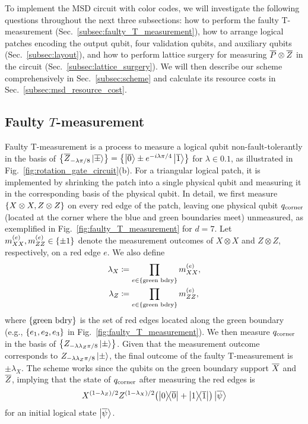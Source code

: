 \documentclass[
 prx,
 reprint,
 superscriptaddress,
 longbibliography,
 dvipsnames
]{revtex4-2}
\begin{document}
To implement the MSD circuit with color codes, we will investigate the following questions throughout the next three subsections: how to perform the faulty T-measurement (Sec.~\ref{subsec:faulty_T_measurement}), how to arrange logical patches encoding the output qubit, four validation qubits, and auxiliary qubits (Sec.~\ref{subsec:layout}), and how to perform lattice surgery for measuring $\overline{P} \otimes \overline{Z}$ in the circuit (Sec.~\ref{subsec:lattice_surgery}).
We will then describe our scheme comprehensively in Sec.~\ref{subsec:scheme} and calculate its resource costs in Sec.~\ref{subsec:msd_resource_cost}.

\subsection{Faulty $T$-measurement \label{subsec:faulty_T_measurement}}

Faulty T-measurement is a process to measure a logical qubit non-fault-tolerantly in the basis of $\qty{\overline{Z}_{-\lambda\pi/8} \ket{\overline{\pm}}} = \qty{\ket{\overline{0}} \pm e^{-i\lambda\pi/4} \ket{\overline{1}}}$ for $\lambda \in \qty{0, 1}$, as illustrated in Fig.~\ref{fig:rotation_gate_circuit}(b).
For a triangular logical patch, it is implemented by shrinking the patch into a single physical qubit and measuring it in the corresponding basis of the physical qubit.
In detail, we first measure $\qty{X \otimes X, Z \otimes Z}$ on every red edge of the patch, leaving one physical qubit $q_{\mathrm{corner}}$ (located at the corner where the blue and green boundaries meet) unmeasured, as exemplified in Fig.~\ref{fig:faulty_T_measurement} for $d=7$.
Let $m_{XX}^{(e)}, m_{ZZ}^{(e)} \in \qty{\pm 1}$ denote the measurement outcomes of $X \otimes X$ and $Z \otimes Z$, respectively, on a red edge $e$.
We also define
\begin{align}
\begin{split}
    \lambda_{X} &\coloneqq \prod_{e \in \qty{\text{green bdry}}} m_{XX}^{(e)}, \\
    \lambda_{Z} &\coloneqq \prod_{e \in \qty{\text{green bdry}}} m_{ZZ}^{(e)},
\end{split}
    \label{eq:faulty_T_measurement_outcomes}
\end{align}
where $\qty{\text{green bdry}}$ is the set of red edges located along the green boundary (e.g., $\qty{e_1, e_2, e_3}$ in Fig.~\ref{fig:faulty_T_measurement}).
We then measure $q_{\mathrm{corner}}$ in the basis of $\qty{Z_{-\lambda \lambda_Z \pi/8}\ket{\pm}}$.
Given that the measurement outcome corresponds to $Z_{-\lambda \lambda_Z \pi/8}\ket{\pm}$, the final outcome of the faulty T-measurement is $\pm \lambda_X$.
The scheme works since the qubits on the green boundary support $\overline{X}$ and $\overline{Z}$, implying that the state of $q_{\mathrm{corner}}$ after measuring the red edges is
\begin{align*}
    X^{(1 - \lambda_Z)/2} Z^{(1 - \lambda_X)/2} \qty(\ketbra{0}{\overline{0}} + \ketbra{1}{\overline{1}})\ket{\overline{\psi}}
\end{align*}
for an initial logical state $\ket{\overline{\psi}}$.
\end{document}
